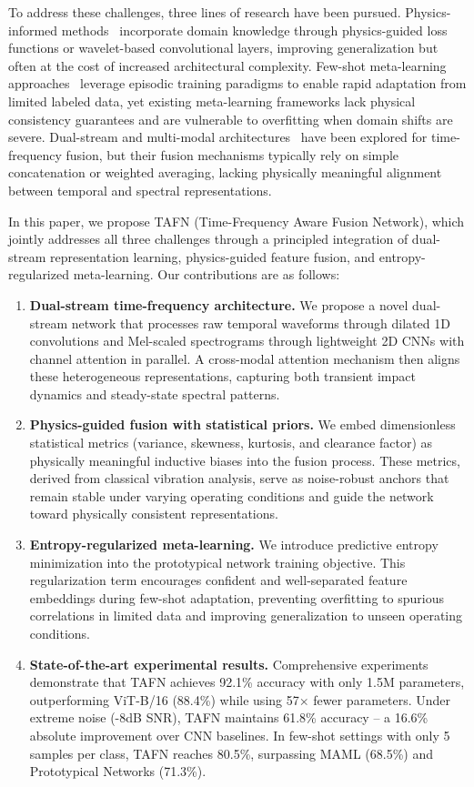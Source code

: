 To address these challenges, three lines of research have been pursued. Physics-informed methods~\cite{wang2020physics,shen2023physics} incorporate domain knowledge through physics-guided loss functions or wavelet-based convolutional layers, improving generalization but often at the cost of increased architectural complexity. Few-shot meta-learning approaches~\cite{li2021meta,sun2022multi} leverage episodic training paradigms to enable rapid adaptation from limited labeled data, yet existing meta-learning frameworks lack physical consistency guarantees and are vulnerable to overfitting when domain shifts are severe. Dual-stream and multi-modal architectures~\cite{zhao2021fdfnet,han2022mcformer} have been explored for time-frequency fusion, but their fusion mechanisms typically rely on simple concatenation or weighted averaging, lacking physically meaningful alignment between temporal and spectral representations.

In this paper, we propose TAFN (Time-Frequency Aware Fusion Network), which jointly addresses all three challenges through a principled integration of dual-stream representation learning, physics-guided feature fusion, and entropy-regularized meta-learning. Our contributions are as follows:

\begin{enumerate}
    \item \textbf{Dual-stream time-frequency architecture.} We propose a novel dual-stream network that processes raw temporal waveforms through dilated 1D convolutions and Mel-scaled spectrograms through lightweight 2D CNNs with channel attention in parallel. A cross-modal attention mechanism then aligns these heterogeneous representations, capturing both transient impact dynamics and steady-state spectral patterns.
    \item \textbf{Physics-guided fusion with statistical priors.} We embed dimensionless statistical metrics (variance, skewness, kurtosis, and clearance factor) as physically meaningful inductive biases into the fusion process. These metrics, derived from classical vibration analysis, serve as noise-robust anchors that remain stable under varying operating conditions and guide the network toward physically consistent representations.
    \item \textbf{Entropy-regularized meta-learning.} We introduce predictive entropy minimization into the prototypical network training objective. This regularization term encourages confident and well-separated feature embeddings during few-shot adaptation, preventing overfitting to spurious correlations in limited data and improving generalization to unseen operating conditions.
    \item \textbf{State-of-the-art experimental results.} Comprehensive experiments demonstrate that TAFN achieves 92.1\% accuracy with only 1.5M parameters, outperforming ViT-B/16 (88.4\%) while using 57$\times$ fewer parameters. Under extreme noise (-8dB SNR), TAFN maintains 61.8\% accuracy -- a 16.6\% absolute improvement over CNN baselines. In few-shot settings with only 5 samples per class, TAFN reaches 80.5\%, surpassing MAML (68.5\%) and Prototypical Networks (71.3\%).
\end{enumerate}

